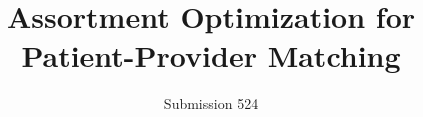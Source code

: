 \documentclass[format=acmsmall, review=false]{acmart}
\title[Assortment Optimization for Patient-Provider Matching]{Assortment Optimization for Patient-Provider Matching}
\author{Submission 524}
\begin{document}
\begin{titlepage}
\maketitle
\setcounter{tocdepth}{2} %
\tableofcontents

\end{titlepage}
\pagebreak 

\setcounter{tocdepth}{2} 












\newpage 

\appendix 

\end{document}
